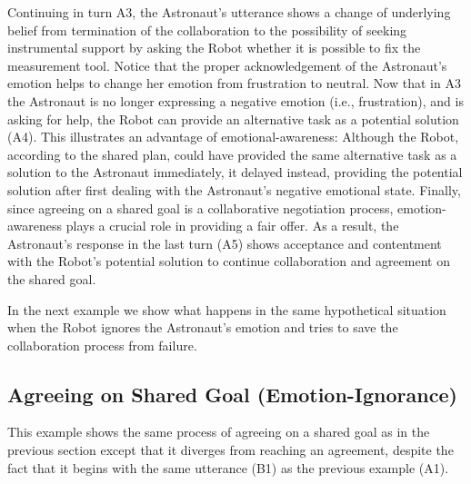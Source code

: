 Continuing in turn A3, the Astronaut's utterance shows a change of underlying
belief from termination of the collaboration to the possibility of seeking
instrumental support by asking the Robot whether it is possible to fix the
measurement tool. Notice that the proper acknowledgement of the Astronaut's
emotion helps to change her emotion from frustration to neutral. Now that in A3
the Astronaut is no longer expressing a negative emotion (i.e., frustration),
and is asking for help, the Robot can provide an alternative task as a potential
solution (A4). This illustrates an advantage of emotional-awareness: Although
the Robot, according to the shared plan, could have provided the same
alternative task as a solution to the Astronaut immediately, it delayed instead,
providing the potential solution after first dealing with the Astronaut's
negative emotional state. Finally, since agreeing on a shared goal is a
collaborative negotiation process, emotion-awareness plays a crucial role in
providing a fair offer. As a result, the Astronaut's response in the last turn
(A5) shows acceptance and contentment with the Robot's potential solution to
continue collaboration and agreement on the shared goal.

In the next example we show what happens in the same hypothetical situation when
the Robot ignores the Astronaut's emotion and tries to save the collaboration
process from failure.

\subsection{Agreeing on Shared Goal (Emotion-Ignorance)}
\label{sec:exp2}

This example shows the same process of agreeing on a shared goal as in the
previous section except that it diverges from reaching an agreement, despite the
fact that it begins with the same utterance (B1) as the previous example (A1). 

